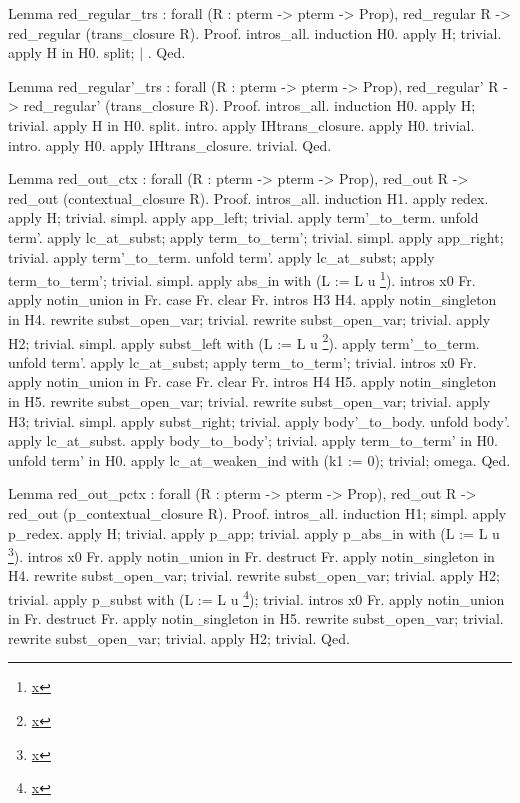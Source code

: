 \documentclass[12pt]{report}
\begin{document}
Lemma red\_regular\_trs : forall (R : pterm -> pterm -> Prop),
  red\_regular R -> red\_regular (trans\_closure R).
Proof.
 intros\_all. induction H0.
 apply H; trivial. 
 apply H in H0. split; 
   \ensuremath{|}  .
Qed. 


Lemma red\_regular'\_trs : forall (R : pterm -> pterm -> Prop),
  red\_regular' R -> red\_regular' (trans\_closure R).
Proof.
 intros\_all. induction H0.
 apply H; trivial. 
 apply H in H0. split.
 intro. apply IHtrans\_closure. apply H0. trivial.
 intro. apply H0. apply IHtrans\_closure. trivial.
Qed. 


Lemma red\_out\_ctx : forall (R : pterm -> pterm -> Prop),
  red\_out R -> red\_out (contextual\_closure R).
Proof.
 intros\_all. induction H1.
 apply redex. apply H; trivial.
 simpl. apply app\_left; trivial.
 apply term'\_to\_term.
 unfold term'. apply lc\_at\_subst;
 apply term\_to\_term'; trivial.
 simpl. apply app\_right; trivial.
 apply term'\_to\_term.
 unfold term'. apply lc\_at\_subst;
 apply term\_to\_term'; trivial.
 simpl. apply abs\_in with (L := L u \footnote{\url{x}}). 
 intros x0 Fr. apply notin\_union in Fr. case Fr. 
 clear Fr. intros H3 H4.
 apply notin\_singleton in H4.
 rewrite subst\_open\_var; trivial.
 rewrite subst\_open\_var; trivial.
 apply H2; trivial.
 simpl. apply subst\_left with (L := L u \footnote{\url{x}}). 
 apply term'\_to\_term.
 unfold term'. apply lc\_at\_subst;
 apply term\_to\_term'; trivial.
 intros x0 Fr. apply notin\_union in Fr. case Fr. 
 clear Fr. intros H4 H5.
 apply notin\_singleton in H5.
 rewrite subst\_open\_var; trivial.
 rewrite subst\_open\_var; trivial.
 apply H3; trivial.
 simpl. apply subst\_right; trivial.
 apply body'\_to\_body.
 unfold body'. apply lc\_at\_subst.
 apply body\_to\_body'; trivial.
 apply term\_to\_term' in H0. unfold term' in H0.
 apply lc\_at\_weaken\_ind with (k1 := 0); trivial; omega.
Qed.


Lemma red\_out\_pctx : forall (R : pterm -> pterm -> Prop),
  red\_out R -> red\_out (p\_contextual\_closure R).
Proof.
 intros\_all. induction H1; simpl.
 apply p\_redex. apply H; trivial.
 apply p\_app; trivial.
 apply p\_abs\_in with (L := L u \footnote{\url{x}}). 
 intros x0 Fr. apply notin\_union in Fr. destruct Fr. 
 apply notin\_singleton in H4.
 rewrite subst\_open\_var; trivial.
 rewrite subst\_open\_var; trivial.
 apply H2; trivial.
 apply p\_subst with (L := L u \footnote{\url{x}}); trivial.
 intros x0 Fr. apply notin\_union in Fr. destruct Fr. 
 apply notin\_singleton in H5.
 rewrite subst\_open\_var; trivial.
 rewrite subst\_open\_var; trivial.
 apply H2; trivial.
Qed.
\end{document}
